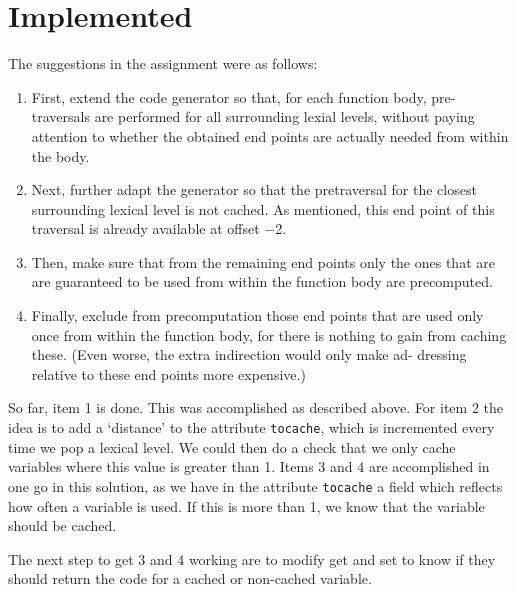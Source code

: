 \documentclass[a4paper]{article}
\begin{document}
\section{Implemented}

The suggestions in the assignment were as follows:

\begin{enumerate}
    \item First, extend the code generator so that, for each function body, pre- traversals are performed for all surrounding lexial levels, without paying attention to whether the obtained end points are actually needed from within the body.
    \item Next, further adapt the generator so that the pretraversal for the closest surrounding lexical level is not cached. As mentioned, this end point of this traversal is already available at offset −2.
    \item Then, make sure that from the remaining end points only the ones that are are guaranteed to be used from within the function body are precomputed.
    \item Finally, exclude from precomputation those end points that are used only once from within the function body, for there is nothing to gain from caching these. (Even worse, the extra indirection would only make ad- dressing relative to these end points more expensive.)
\end{enumerate}

So far, item 1 is done. This was accomplished as described above. For item 2 the idea is to add a `distance' to the attribute \texttt{tocache}, which is incremented every time we pop a lexical level. We could then do a check that we only cache variables where this 
value is greater than 1. Items 3 and 4 are accomplished in one go in this solution, as we have in the attribute \texttt{tocache} a field which reflects how often a variable is used. If this is more than 1, we know that the variable should be cached. 

The next step to get 3 and 4 working are to modify get and set to know if they should return the code for a cached or non-cached variable. 
\end{document}
